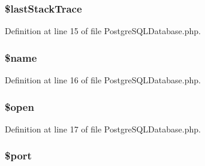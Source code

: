 \subsubsection[{\$last\+Stack\+Trace}]{\setlength{\rightskip}{0pt plus 5cm}\$last\+Stack\+Trace\hspace{0.3cm}{\ttfamily [protected]}}\label{class_postgre_s_q_l_database_a12ff8f78a47e0fa691355a485c2e696a}


Definition at line 15 of file Postgre\+S\+Q\+L\+Database.\+php.

\hypertarget{class_postgre_s_q_l_database_ab2fc40d43824ea3e1ce5d86dee0d763b}{}
\subsubsection[{\$name}]{\setlength{\rightskip}{0pt plus 5cm}\$name\hspace{0.3cm}{\ttfamily [protected]}}\label{class_postgre_s_q_l_database_ab2fc40d43824ea3e1ce5d86dee0d763b}


Definition at line 16 of file Postgre\+S\+Q\+L\+Database.\+php.

\hypertarget{class_postgre_s_q_l_database_a4269f690c0554ecb1deec21b80f321dc}{}
\subsubsection[{\$open}]{\setlength{\rightskip}{0pt plus 5cm}\$open\hspace{0.3cm}{\ttfamily [protected]}}\label{class_postgre_s_q_l_database_a4269f690c0554ecb1deec21b80f321dc}


Definition at line 17 of file Postgre\+S\+Q\+L\+Database.\+php.

\hypertarget{class_postgre_s_q_l_database_aa0787efab4b22e8a212882f3409d4c77}{}
\subsubsection[{\$port}]{\setlength{\rightskip}{0pt plus 5cm}\$port\hspace{0.3cm}{\ttfamily [protected]}}\label{class_postgre_s_q_l_database_aa0787efab4b22e8a212882f3409d4c77}



